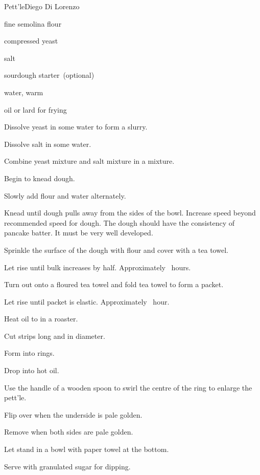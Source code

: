 \begin{recipe}{Pett'le\FIXME}{Diego Di Lorenzo}{}

\begin{ingredients}
\item {} fine semolina flour
\item {} compressed yeast
\item {} salt
\item {} sourdough starter~(optional)
\item {}\FIXME{} water, warm
\item oil or lard for frying
\end{ingredients}

\begin{directions}
\item Dissolve yeast in some water to form a slurry.
\item Dissolve salt in some water.
\item Combine yeast mixture and salt mixture in a mixture.
\item Begin to knead dough.
\item Slowly add flour and water alternately.
\item Knead until dough pulls away from the sides of the bowl. Increase speed beyond recommended speed for dough. The dough should have the consistency of pancake batter. It must be very well developed.
\item Sprinkle the surface of the dough with flour and cover with a tea towel.
\item Let rise until bulk increases by half. Approximately \threequarter{}~hours.
\item Turn out onto a floured tea towel and fold tea towel to form a packet.
\item Let rise until packet is elastic. Approximately \half{}~hour.
\item Heat oil to  in a roaster.
\item Cut strips  long and \inch{\threequarter} in diameter.
\item Form into rings.
\item Drop into hot oil.
\item Use the handle of a wooden spoon to swirl the centre of the ring to enlarge the pett'le.
\item Flip over when the underside is pale golden.
\item Remove when both sides are pale golden.
\item Let stand in a bowl with paper towel at the bottom.
\item Serve with granulated sugar for dipping.
\end{directions}

\end{recipe}
